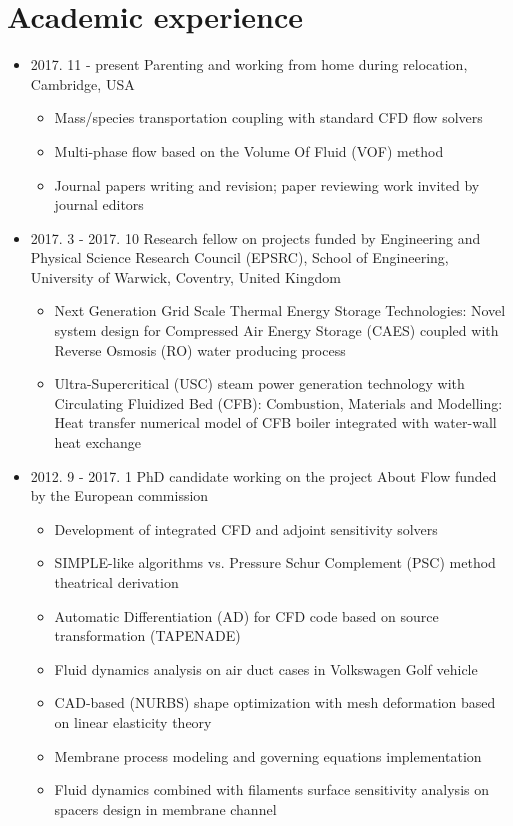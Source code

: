 \documentclass[letterpaper]{article}
\begin{document}
\section*{Academic experience}
\vspace{-10pt}
\begin{itemize}
\item 2017. 11 - present \hspace{2pt} Parenting and working from home during relocation, Cambridge, USA
		\begin{itemize}
		\item Mass/species transportation coupling with standard CFD flow solvers
		\item Multi-phase flow based on the Volume Of Fluid (VOF) method
		\item	Journal papers writing and revision; paper reviewing work invited by journal editors
		\end{itemize}		
\item 2017. 3 - 2017. 10  \hspace{2pt} Research fellow on projects funded by Engineering and Physical Science Research Council (EPSRC), School of Engineering, University of Warwick, Coventry, United Kingdom
		\begin{itemize}
		\item	Next Generation Grid Scale Thermal Energy Storage Technologies: Novel system design for Compressed Air Energy Storage (CAES) coupled with Reverse Osmosis (RO) water producing process
		\item	Ultra-Supercritical (USC) steam power generation technology with Circulating Fluidized Bed (CFB): Combustion, Materials and Modelling: Heat transfer numerical model of CFB boiler integrated with water-wall heat exchange
		\end{itemize}

\item 2012. 9 - 2017. 1  \hspace{2pt} PhD candidate working on the project About Flow funded by the European commission
		\begin{itemize}
		\item Development of integrated CFD and adjoint sensitivity solvers
		\item	SIMPLE-like algorithms vs. Pressure Schur Complement (PSC) method theatrical derivation
		\item	Automatic Differentiation (AD) for CFD code based on source transformation (TAPENADE)
		\item	Fluid dynamics analysis on air duct cases in Volkswagen Golf vehicle
		\item	CAD-based (NURBS) shape optimization with mesh deformation based on linear elasticity theory  
		\item	Membrane process modeling and governing equations implementation
		\item	Fluid dynamics combined with filaments surface sensitivity analysis on spacers design in membrane channel
		\end{itemize}
		

\end{itemize}
\end{document}
